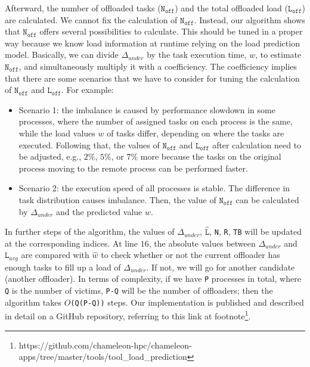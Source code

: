 Afterward, the number of offloaded tasks ($\texttt{N}_{\texttt{off}}$) and the total offloaded load ($\texttt{L}_{\texttt{off}}$) are calculated. We cannot fix the calculation of $\texttt{N}_{\texttt{off}}$. Instead, our algorithm shows that $\texttt{N}_{\texttt{off}}$ offers several possibilities to calculate. This should be tuned in a proper way because we know load information at runtime relying on the load prediction model. Basically, we can divide $\Delta_{under}$ by the task execution time, $w$, to estimate $\texttt{N}_{\texttt{off}}$, and simultaneously multiply it with a coefficiency. The coefficiency implies that there are some scenarios that we have to consider for tuning the calculation of $\texttt{N}_{\texttt{off}}$ and $\texttt{L}_{\texttt{off}}$. For example:
\begin{itemize}
	\item Scenario 1: the imbalance is caused by performance slowdown in some processes, where the number of assigned tasks on each process is the same, while the load values $w$ of tasks differ, depending on where the tasks are executed. Following that, the values of $\texttt{N}_{\texttt{off}}$ and $\texttt{L}_{\texttt{off}}$ after calculation need to be adjusted, e.g., $2\%$, $5\%$, or $7\%$ more because the tasks on the original process moving to the remote process can be performed faster.

	\item Scenario 2: the execution speed of all processes is stable. The difference in task distribution causes imbalance. Then, the value of $\texttt{N}_{\texttt{off}}$ can be calculated by $\Delta_{under}$ and the predicted value $w$.
\end{itemize}

In further steps of the algorithm, the values of $\Delta_{under}$, $\hat{\texttt{L}}$, \texttt{N}, \texttt{R}, \texttt{TB} will be updated at the corresponding indices. At line $16$, the absolute values between $\Delta_{under}$ and $\texttt{L}_{avg}$ are compared with $\hat{w}$ to check whether or not the current offloader has enough tasks to fill up a load of $\Delta_{under}$. If not, we will go for another candidate (another offloader). In terms of complexity, if we have \texttt{P} processes in total, where \texttt{Q} is the number of victims, \texttt{P-Q} will be the number of offloaders; then the algorithm takes $O$\texttt{(Q(P-Q))} steps. Our implementation is published and described in detail on a GitHub repository, referring to this link at footnote\footnote{\label{notechamtool}https://github.com/chameleon-hpc/chameleon-apps/tree/master/tools/tool\_load\_prediction}.

